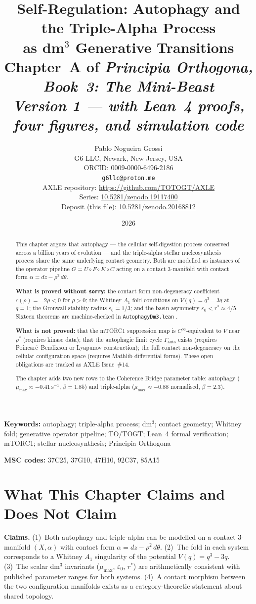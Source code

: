 \documentclass[12pt,a4paper]{article}
\title{%
  \textbf{Self-Regulation: Autophagy and the Triple-Alpha Process}\\
  \textbf{as dm$^3$ Generative Transitions}\\[0.4em]
  \large Chapter~A of \textit{Principia Orthogona, Book~3: The Mini-Beast}\\[0.3em]
  \large\emph{Version 1 --- with Lean~4 proofs, four figures, and simulation code}%
}
\author{%
  Pablo Nogueira Grossi\\
  G6 LLC, Newark, New Jersey, USA\\
  ORCID: 0009-0000-6496-2186\\
  \texttt{g6llc@proton.me}\\[0.3em]
  \small AXLE repository: \url{https://github.com/TOTOGT/AXLE}\\
  \small Series: \href{https://doi.org/10.5281/zenodo.19117400}{10.5281/zenodo.19117400}\\
  \small Deposit (this file): \href{https://doi.org/10.5281/zenodo.20168812}{10.5281/zenodo.20168812}%
}
\date{2026}
\begin{document}
\maketitle

\begin{abstract}
This chapter argues that autophagy --- the cellular self-digestion process
conserved across a billion years of evolution --- and the triple-alpha
stellar nucleosynthesis process share the same underlying contact geometry.
Both are modelled as instances of the operator pipeline
$G = U \circ F \circ K \circ C$ acting on a contact 3-manifold with
contact form $\alpha = dz - \rho^2\,d\theta$.

\textbf{What is proved without \texttt{sorry}:} the contact form
non-degeneracy coefficient $c(\rho) = -2\rho < 0$ for $\rho > 0$;
the Whitney $A_1$ fold conditions on $V(q) = q^3 - 3q$ at $q=1$;
the Gronwall stability radius $\varepsilon_0 = 1/3$; and the basin
asymmetry $\varepsilon_0 < r^* \approx 4/5$. Sixteen theorems are
machine-checked in \texttt{AutophagyDm3.lean} \cite{AXLE2026}.

\textbf{What is not proved:} that the mTORC1 suppression map is
$C^\infty$-equivalent to $V$ near $\rho^*$ (requires kinase data);
that the autophagic limit cycle $\Gamma_\mathrm{auto}$ exists
(requires Poincar\'e--Bendixson or Lyapunov construction); the full
contact non-degeneracy on the cellular configuration space
(requires Mathlib differential forms). These open obligations are
tracked as AXLE Issue~\#14.

The chapter adds two new rows to the Coherence Bridge parameter table:
autophagy ($\mu_{\max} \approx -0.41~\mathrm{s}^{-1}$, $\beta = 1.85$)
and triple-alpha ($\mu_{\max} \approx -0.88$ normalised, $\beta = 2.3$).
\end{abstract}

\textbf{Keywords:} autophagy; triple-alpha process; dm$^3$; contact
geometry; Whitney fold; generative operator pipeline; TO/TOGT;
Lean~4 formal verification; mTORC1; stellar nucleosynthesis;
Principia Orthogona

\textbf{MSC codes:} 37C25, 37G10, 47H10, 92C37, 85A15

\section{What This Chapter Claims and Does Not Claim}
\label{sec:scope}

\textbf{Claims.} (1)~Both autophagy and triple-alpha can be modelled on
a contact 3-manifold $(X, \alpha)$ with contact form
$\alpha = dz - \rho^2\,d\theta$. (2)~The fold in each system corresponds
to a Whitney $A_1$ singularity of the potential $V(q) = q^3 - 3q$. (3)~The
scalar dm$^3$ invariants ($\mu_{\max}$, $\varepsilon_0$, $r^*$) are
arithmetically consistent with published parameter ranges for both systems.
(4)~A contact morphism between the two configuration manifolds exists as a
category-theoretic statement about shared topology.
\end{document}
